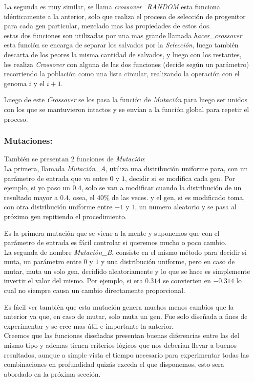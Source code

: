La segunda es muy similar, se llama \emph{crossover\_RANDOM} esta funciona idénticamente a la anterior, solo que realiza el proceso
de selección de progenitor para cada gen particular, mezclado mas las propiedades de estos dos.\\

estas dos funciones son utilizadas por una mas grande llamada \emph{hacer\_crossover} esta función se encarga de separar los salvados
por la \emph{Selección}, luego también descarta de los peores la misma cantidad de salvados, y luego con los restantes, les realiza
\emph{Crossover} con alguna de las dos funciones (decide según un parámetro) recorriendo la población como una lista circular,
realizando la operación con el genoma $i$ y el $i+1$.

Luego de este \emph{Crossover} se los pasa la función de \emph{Mutación} para luego ser unidos con los que se mantuvieron
intactos y se envían a la función global para repetir el proceso.


\subsubsection{Mutaciones:}

También se presentan 2 funciones de \emph{Mutación}:\\

La primera, llamada \emph{Mutación\_A}, utiliza una distribución uniforme para, con un parámetro de entrada que va entre $0$ y $1$,
decidir si se modifica cada gen. Por ejemplo, si yo paso un $0.4$, solo se van a modificar cuando
la distribución de un resultado mayor a $0.4$, osea, el $40\%$ de las veces. y el gen, si es modificado toma,
con otra distribución uniforme entre $-1$ y $1$, un numero aleatorio y se pasa al próximo gen repitiendo
el procedimiento.


Es la primera mutación que se viene a la mente y suponemos que con el parámetro de entrada es fácil controlar si queremos
mucho o poco cambio.\\

La segunda de nombre \emph{Mutación\_B}, consiste en el mismo método para decidir si muta, un parámetro  entre $0$ y $1$
y una distribución uniforme, pero en caso de mutar, muta un solo gen, decidido aleatoriamente y lo que se hace es simplemente
invertir el valor del mismo. Por ejemplo, si era $0.314$ se convierten en $-0.314$ lo cual no siempre causa un cambio
directamente proporcional.

Es fácil ver también que esta mutación genera muchos menos cambios que la anterior ya que, en caso de mutar, solo muta un gen.
Fue solo diseñada a fines de experimentar y se cree mas útil e importante la anterior.
\\

Creemos que las funciones diseñadas presentan buenas diferencias entre las del mismo tipo y ademas tienen criterios lógicos que
nos deberían llevar a buenos resultados, aunque a simple vista el tiempo necesario para experimentar todas las combinaciones
 en profundidad quizás exceda el que disponemos, esto sera abordado en la próxima sección.
